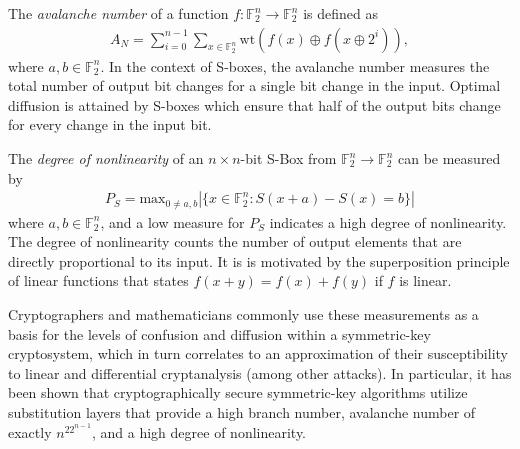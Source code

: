 \documentclass[11pt]{article}
\newcommand{\field}[1]{\mathbb{#1}} %
\begin{document}
\begin{define}
The \emph{avalanche number} of a function $f : \field{F}_2^n \to \field{F}_2^n$ is defined as
\begin{eqnarray}
A_N = \sum_{i = 0}^{n - 1}\sum_{x \in \field{F}_2^n} \text{wt}(f(x) \oplus f(x \oplus 2^{i})),
\end{eqnarray}
where $a, b \in \field{F}_2^n$. In the context of S-boxes, the avalanche number measures the total number of output bit changes for a single bit change in the input. Optimal diffusion is attained by S-boxes which ensure that half of the output bits change for every change in the input bit.
\end{define}

\begin{define}
The \emph{degree of nonlinearity} of an $n \times n$-bit S-Box from $\field{F}_2^n \to \field{F}_2^n$ can be measured by
\begin{eqnarray}
	P_S = \text{max}_{0 \not= a, b}|\{x \in \field{F}_2^n : S(x + a) - S(x) = b\}|
\end{eqnarray}
where $a, b \in \field{F}_2^n$, and a low measure for $P_S$ indicates a high degree of nonlinearity. The degree of nonlinearity counts the number of output elements that are directly proportional to its input. It is is motivated by the superposition principle of linear functions that states $f(x + y) = f(x) + f(y)$ if $f$ is linear.
\end{define}

Cryptographers and mathematicians commonly use these measurements as a basis for the levels of confusion and diffusion within a symmetric-key cryptosystem, which in turn correlates to an approximation of their susceptibility to linear and differential cryptanalysis (among other attacks). In particular, it has been shown that cryptographically secure symmetric-key algorithms utilize substitution layers that provide a high branch number, avalanche number of exactly $n^22^{n-1}$, and a high degree of nonlinearity.

\end{document}
